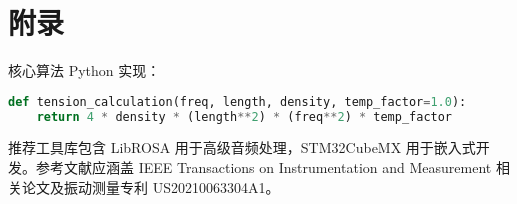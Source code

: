 \chapter{附录}
核心算法 Python 实现：\par
\begin{lstlisting}[language=python]
def tension_calculation(freq, length, density, temp_factor=1.0):
    return 4 * density * (length**2) * (freq**2) * temp_factor
\end{lstlisting}
推荐工具库包含 LibROSA 用于高级音频处理，STM32CubeMX 用于嵌入式开发。参考文献应涵盖 IEEE Transactions on Instrumentation and Measurement 相关论文及振动测量专利 US20210063304A1。\par
